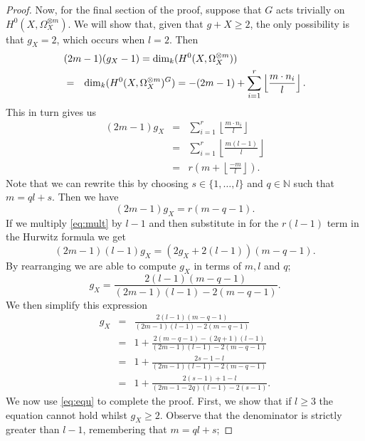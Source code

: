 \documentclass[11pt]{article} %
\begin{document}
\begin{proof}
    Now, for the final section of the proof, suppose that $G$ acts trivially on $H^0(X,\Omega_X^{\otimes m})$. 
    We will show that, given that $g+X\geq 2$, the only possibility is that $g_X=2$, which occurs when $l=2$.
    Then 
      \begin{eqnarray*}
	\lefteqn{(2m-1)(g_X-1)=\dim_k(H^0(X,\Omega_X^{\otimes m}))} \\
	& = & \dim_k(H^0(X,\Omega_X^{\otimes m})^G)=-(2m-1)+\sum_{i=1}^r \left\lfloor \frac{m\cdot n_i}{l} \right\rfloor.
      \end{eqnarray*}
    This in turn gives us
      \begin{eqnarray*}
	(2m-1)g_X & = & \sum_{i=1}^r \left\lfloor \frac{m\cdot n_i}{l} \right\rfloor\\
	& = & \sum_{i=1}^r \left\lfloor \frac{m(l-1)}{l} \right\rfloor\\
	& = & r\left( m+\left\lfloor \frac{-m}{l} \right\rfloor \right).
      \end{eqnarray*}
    Note that we can rewrite this by choosing $s\in \{1,\ldots ,l\}$ and $q\in \mathbb{N}$ such that $m=ql+s$. 
    Then we have
      \begin{equation}\label{eq:mult}
	(2m-1)g_X=r(m-q-1).
      \end{equation}
    If we multiply \eqref{eq:mult} by $l-1$ and then substitute in for the $r(l-1)$ term in the Hurwitz formula we get
      \begin{equation*}
	(2m-1)(l-1)g_X=(2g_X+2(l-1))(m-q-1).
      \end{equation*}
    By rearranging we are able to compute $g_X$ in terms of $m,l$ and $q$;
      \begin{equation*}
	g_X=\frac{2(l-1)(m-q-1)}{(2m-1)(l-1)-2(m-q-1)}.
      \end{equation*}
    We then simplify this expression
      \begin{eqnarray}\label{eq:equ}
	g_X & = & \frac{2(l-1)(m-q-1)}{(2m-1)(l-1)-2(m-q-1)} \nonumber \\
	& = & 1 + \frac{2(m-q-1)-(2q+1)(l-1)}{(2m-1)(l-1)-2(m-q-1)} \nonumber \\
	& = & 1 + \frac{2s-1-l}{(2m-1)(l-1)-2(m-q-1)} \nonumber \\
	& = & 1 + \frac{2(s-1)+1-l}{(2m-1-2q)(l-1)-2(s-1)}. 
      \end{eqnarray}
    We now use \eqref{eq:equ} to complete the proof.
    First, we show that if $l\geq 3$ the equation cannot hold whilst $g_X\geq 2$.
    Observe that the denominator is strictly greater than $l-1$, remembering that $m=ql+s$;

\end{proof}
\end{document}
